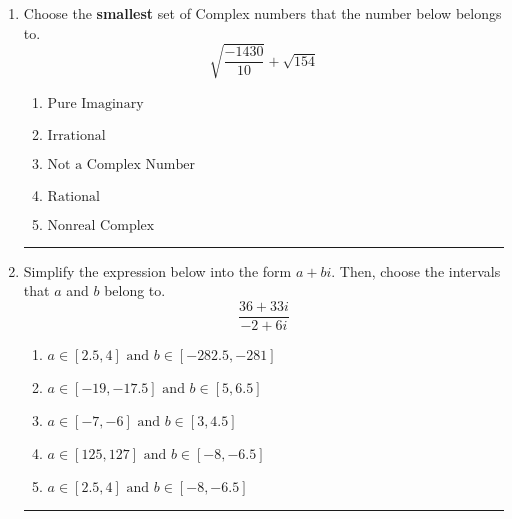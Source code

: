 \documentclass[14pt]{extbook}
\newcommand{\litem}[1]{\item#1\hspace*{-1cm}\rule{\textwidth}{0.4pt}}
\begin{document}
\begin{enumerate}
{\begin{enumerate}[label=\Alph*.]
\end{enumerate} }
\litem{
Choose the \textbf{smallest} set of Complex numbers that the number below belongs to.\[ \sqrt{\frac{-1430}{10}}+\sqrt{154} \]\begin{enumerate}[label=\Alph*.]
\item \( \text{Pure Imaginary} \)
\item \( \text{Irrational} \)
\item \( \text{Not a Complex Number} \)
\item \( \text{Rational} \)
\item \( \text{Nonreal Complex} \)

\end{enumerate} }
\litem{
Simplify the expression below into the form $a+bi$. Then, choose the intervals that $a$ and $b$ belong to.\[ \frac{36 + 33 i}{-2 + 6 i} \]\begin{enumerate}[label=\Alph*.]
\item \( a \in [2.5, 4] \text{ and } b \in [-282.5, -281] \)
\item \( a \in [-19, -17.5] \text{ and } b \in [5, 6.5] \)
\item \( a \in [-7, -6] \text{ and } b \in [3, 4.5] \)
\item \( a \in [125, 127] \text{ and } b \in [-8, -6.5] \)
\item \( a \in [2.5, 4] \text{ and } b \in [-8, -6.5] \)

\end{enumerate} }
\end{enumerate}
\end{document}
